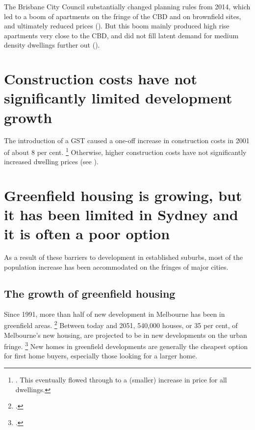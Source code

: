 The Brisbane City Council substantially changed planning rules from 2014, which led to a boom of apartments on the fringe of the CBD and on brownfield sites, and ultimately reduced prices ().
But this boom mainly produced high rise apartments very close to the CBD, and did not fill latent demand for medium density dwellings further out ().
    

\section{Construction costs have not significantly limited development growth}\label{sec:construction-costs-havent-limited-development}


The introduction of a GST caused a one-off increase in construction costs in 2001 of about 8 per cent.%
	\footnote{\textcites{ProductivityCommission2004FirstHomeOwnership}{BergerThomsonEllis2004HousingConstruction}.
This eventually flowed through to a (smaller) increase in price for all dwellings.}
Otherwise, higher construction costs have not significantly increased dwelling prices (see ).

\section{Greenfield housing is growing, but it has been limited in Sydney and it is often a poor option}\label{sec:greenfield-housing-is-growing-but-it-has-been-limited-in-sydney-and-it-is-often-a-poor-option}

As a result of these barriers to development in established suburbs, most of the population increase has been accommodated on the fringes of major cities.

\subsection{The growth of greenfield housing}\label{subsec:the-growth-of-greenfield-housing}

Since 1991, more than half of new development in Melbourne has been in greenfield areas.%
	\footcite{Deacon-2014-Share-urban-dev-greenfield-vs-established-areas}
Between today and 2051, 540,000 houses, or 35 per cent, of Melbourne's new housing, are projected to be in new developments on the urban fringe.%
	\footcites{VicTransport2014VicFuture}[][Figure~7]{VicGov2017PlanMelb}
New homes in greenfield developments are generally the cheapest option for first home buyers, especially those looking for a larger home.

